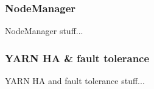 \subsubsection{NodeManager}
\label{sssec:nm}
NodeManager stuff...

\subsubsection{YARN HA \& fault tolerance}
\label{sssec:yarn_ha}
YARN HA and fault tolerance stuff...
